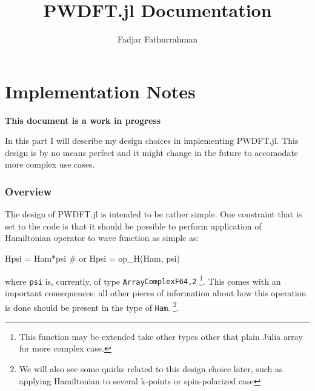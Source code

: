 \documentclass[a4paper,10pt]{article}
\newcommand{\jlinline}[1]{\texttt{#1}}
\begin{document}
\title{\textsf{PWDFT.jl} Documentation}
\author{Fadjar Fathurrahman}
\maketitle

\tableofcontents

\part{Implementation Notes}

\textbf{This document is a work in progress}

In this part I will describe my design choices in implementing \textsf{PWDFT.jl}.
This design is by no means perfect
and it might change in the future to accomodate more complex use cases.

\section{Overview}

The design of \textsf{PWDFT.jl} is intended to be rather simple. One constraint
that is set to the code is that it should be possible to perform application
of Hamiltonian operator to wave function as simple as:
%
\begin{juliacode}
Hpsi = Ham*psi # or
Hpsi = op_H(Ham, psi)
\end{juliacode}
%
where \jlinline{psi} is, currently, of type \jlinline{Array{ComplexF64,2}}
\footnote{This function may be extended take other types other that plain Julia
array for more complex case.}.
%
This comes with an important consequences: all other pieces of information
about how this operation is done should be present in the type of \jlinline{Ham}.
\footnote{We will also see some quirks related to this design choice later,
such as applying Hamiltonian to several k-points or spin-polarized case}.
\end{document}
